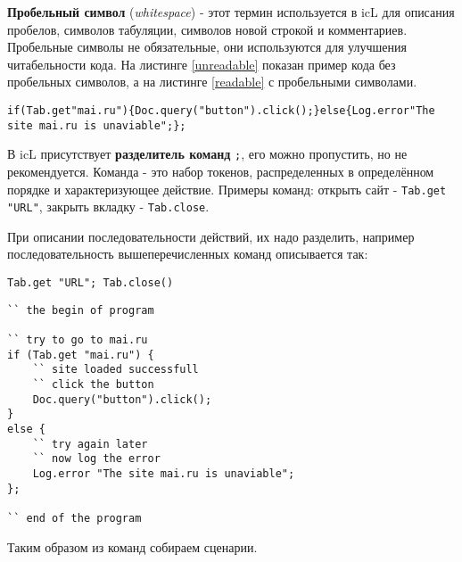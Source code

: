 \textbf{Пробельный символ} (\textit{whitespace}) - этот термин используется в icL для описания пробелов, символов табуляции, символов новой строкой и комментариев. Пробельные символы не обязательные, они используются для улучшения читабельности кода. На листинге \ref{unreadable} показан пример кода без пробельных символов, а на листинге \ref{readable} с пробельными символами.

\begin{sourcecode}
\label{unreadable}
\begin{verbatim}
if(Tab.get"mai.ru"){Doc.query("button").click();}else{Log.error"The site mai.ru is unaviable";};
\end{verbatim}
\end{sourcecode}

В icL присутствует \textbf{разделитель команд} \texttt{;}, его можно пропустить, но не рекомендуется. Команда - это набор токенов, распределенных в определённом порядке и характеризующее действие. Примеры команд: открыть сайт - \texttt{Tab.get "URL"}, закрыть вкладку - \texttt{Tab.close}.

При описании последовательности действий, их надо разделить, например последовательность вышеперечисленных команд описывается так:
\begin{verbatim}
Tab.get "URL"; Tab.close()
\end{verbatim}

\begin{sourcecode}
\label{readable}
\begin{verbatim}
`` the begin of program

`` try to go to mai.ru
if (Tab.get "mai.ru") {
	`` site loaded successfull
	`` click the button
	Doc.query("button").click();
}
else {
	`` try again later
	`` now log the error
	Log.error "The site mai.ru is unaviable";
};

`` end of the program
\end{verbatim}
\end{sourcecode}

Таким образом из команд собираем сценарии.
